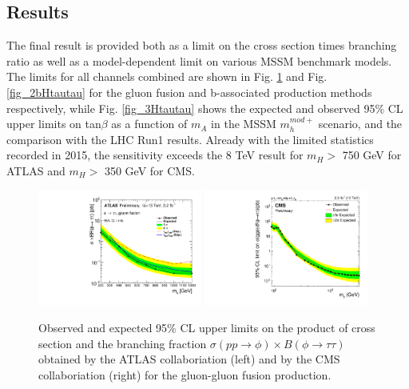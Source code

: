 \subsection{Results}
The final result is provided both as a limit on the cross section times branching ratio as well
as a model-dependent limit on various MSSM benchmark models. The limits for all channels combined are shown in Fig. \ref{fig_2aHtautau} and Fig. \ref{fig_2bHtautau}
for the gluon fusion and b-associated production methods respectively, while Fig. \ref{fig_3Htautau} shows the expected and observed 95\% CL upper limits on tan$\beta$ as a function of $m_{A}$ in the MSSM $m_{h}^{mod+}$ scenario, and the comparison with the LHC Run1 results. Already with the  limited statistics recorded in 2015, the sensitivity exceeds the 8 TeV result for $m_{H} >$ 750 GeV for ATLAS and  $m_{H} >$ 350 GeV for CMS. 

\begin{figure}
\centering
\includegraphics[width=0.48\textwidth, angle=0] {figures/fig_2Htautau_a.pdf}
\includegraphics[width=0.48\textwidth, angle=0] {figures/fig_2Htautau_c.pdf}
\caption{ Observed and expected 95\% CL upper limits on the product of cross section and the branching fraction $\sigma(pp\rightarrow \phi) \times B(\phi\rightarrow \tau\tau)$ obtained by the ATLAS collaboriation (left) and by the CMS collaboriation (right) for the gluon-gluon fusion production.}
\label{fig_2aHtautau}   
\end{figure}

